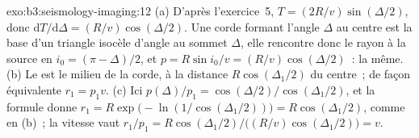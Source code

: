 \begin{solution}{exo:b3:seismology-imaging:12}
(a) D'après l'exercice~5, $T = (2R/v)\sin(\Delta/2)$, donc $\mathrm dT/\mathrm d\Delta
= (R/v)\cos(\Delta/2)$. Une corde formant l'angle $\Delta$ au centre est la
base d'un triangle isocèle d'angle au sommet $\Delta$, elle rencontre donc le rayon
à la source en $i_0 = (\pi - \Delta)/2$, et $p = R\sin i_0/v =
(R/v)\cos(\Delta/2)$~: la même. (b) Le  est le milieu de la
corde, à la distance $R\cos(\Delta_1/2)$ du centre~; de façon équivalente
$r_1 = p_1v$. (c) Ici $p(\Delta)/p_1 = \cos(\Delta/2)/\cos(\Delta_1/2)$, et
la formule donne $r_1 = R\exp\bigl(-\ln(1/\cos(\Delta_1/2))\bigr) =
R\cos(\Delta_1/2)$, comme en (b)~; la vitesse vaut $r_1/p_1 = R\cos(\Delta_1/2)\big/
\bigl((R/v)\cos(\Delta_1/2)\bigr) = v$.
\end{solution}

